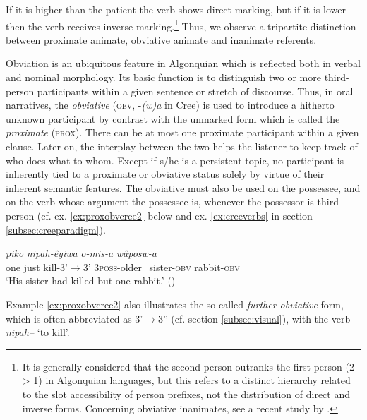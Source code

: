 \documentclass[twoside,a4paper,11pt]{article}
\newcommand{\ipa}[1]{{\phon\textit{#1}}}
\newcommand{\Σ}{\greek{Σ}}
\newcommand{\obv}{\textsc{obv}}
\newcommand{ \prox}{\textsc{prox}}
\begin{document}
If it is higher than the patient the verb shows direct marking, but if it is lower then the verb receives inverse marking.\footnote{It is generally considered that the second person outranks the first person (2 > 1) in Algonquian languages, but this refers to a distinct hierarchy related to the slot accessibility of person prefixes, not the distribution of direct and inverse forms. Concerning obviative inanimates, see a recent study by \citet{muehlbauer12obviation}.} Thus, we observe a tripartite distinction between proximate animate, obviative animate and inanimate referents.

Obviation is an ubiquitous feature in Algonquian which is reflected both in verbal and nominal morphology. Its basic function is to distinguish two or more third-person participants within a given sentence or stretch of discourse. Thus, in oral narratives, the \textit{obviative} (\obv, -\textit{(w)a} in Cree) is used to introduce a hitherto unknown participant by contrast with the unmarked form which is called the \textit{proximate} (\prox). There can be  at most one proximate participant within a given clause. Later on, the interplay between the two helps the listener to keep track of who does what to whom. Except if s/he is a persistent topic, no participant is inherently tied to a proximate or obviative status solely by virtue of their inherent semantic features. The obviative must also be used on the possessee, and on the verb whose argument the possessee is, whenever the possessor is third-person (cf. ex. \ref{ex:proxobvcree2} below and ex. \ref{ex:creeverbs} in section \ref{subsec:creeparadigm}).

\begin{exe}
\ex \label{ex:proxobvcree2}
\gll \ipa{pêyak}  \ipa{piko}	\ipa{nipah-êyiwa}  \ipa{o-mis-a} \ipa{wâposw-a}  \\
one just kill-3'$\rightarrow$3'  3\textsc{poss}-older\_sister-\textsc{obv} rabbit-\textsc{obv}\\
\glt  `His sister had killed but one rabbit.'  (\citealp[p. 401]{wolfart96sketch})
\end{exe}

Example \ref{ex:proxobvcree2} also illustrates the so-called \textit{further obviative} form, which is often abbreviated as 3'$\rightarrow$3'' (cf. section \ref{subsec:visual}), with the verb \ipa{nipah--} `to kill'. 
\end{document}

